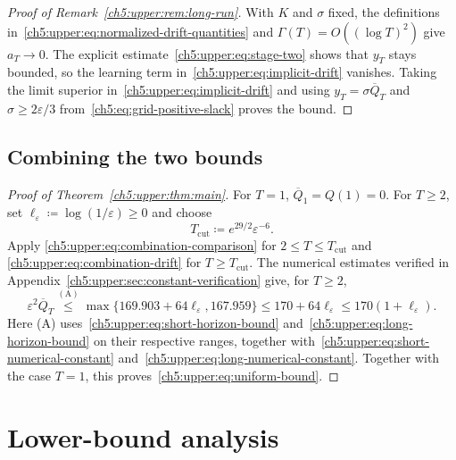 \begin{proof}[Proof of Remark~\ref{ch5:upper:rem:long-run}]
With $K$ and $\sigma$ fixed, the definitions
in~\eqref{ch5:upper:eq:normalized-drift-quantities}
and $\Gamma(T)=O((\log T)^2)$ give $a_T\to0$.
The explicit estimate~\eqref{ch5:upper:eq:stage-two} shows that $y_T$
stays bounded, so the learning term in~\eqref{ch5:upper:eq:implicit-drift}
vanishes. Taking the limit superior in~\eqref{ch5:upper:eq:implicit-drift} and using
$y_T=\sigma\overline Q_T$ and $\sigma\ge2\varepsilon/3$
from~\eqref{ch5:eq:grid-positive-slack} proves the bound.
\end{proof}

\subsection{Combining the two bounds}
\label{ch5:upper:sec:combination}

\begin{proof}[Proof of Theorem~\ref{ch5:upper:thm:main}]
For $T=1$, $\overline Q_1=Q(1)=0$. For $T\ge2$, set
$\ell_\varepsilon\coloneqq\log(1/\varepsilon)\ge0$ and choose
\begin{equation}
 T_{\mathrm{cut}}\coloneqq e^{29/2}\varepsilon^{-6}.
 \label{ch5:upper:eq:cutoff-definition}
\end{equation}
Apply \eqref{ch5:upper:eq:combination-comparison} for
$2\le T\le T_{\mathrm{cut}}$ and
\eqref{ch5:upper:eq:combination-drift} for $T\ge T_{\mathrm{cut}}$.
The numerical estimates verified in
Appendix~\ref{ch5:upper:sec:constant-verification} give, for $T\ge2$,
\begin{equation*}
\varepsilon^2\overline Q_T
 \overset{\mathrm{(A)}}{\le}
 \max\{169.903+64\ell_\varepsilon,167.959\}
\le170+64\ell_\varepsilon
 \le170(1+\ell_\varepsilon).
\end{equation*}
Here (A) uses~\eqref{ch5:upper:eq:short-horizon-bound}
and~\eqref{ch5:upper:eq:long-horizon-bound} on their respective ranges,
together with~\eqref{ch5:upper:eq:short-numerical-constant}
and~\eqref{ch5:upper:eq:long-numerical-constant}. Together with the case $T=1$,
this proves~\eqref{ch5:upper:eq:uniform-bound}.
\end{proof}



\section{Lower-bound analysis}
\label{ch5:lower:section}

